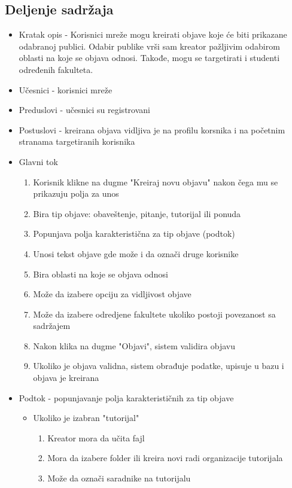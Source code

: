 \subsection{Deljenje sadržaja}
\begin{itemize}
	\item Kratak opis - Korisnici mreže mogu kreirati objave koje će biti prikazane odabranoj publici. Odabir publike vrši sam kreator pažljivim odabirom oblasti na koje se objava odnosi. Takođe, mogu se targetirati i studenti određenih fakulteta.
	\item Učesnici - korisnici mreže
	\item Preduslovi - učesnici su registrovani
	\item Postuslovi - kreirana objava vidljiva je na profilu korsnika i na početnim stranama targetiranih korisnika
	\item Glavni tok
    	\begin{enumerate}
		\item Korisnik klikne na dugme "Kreiraj novu objavu" nakon čega mu se prikazuju polja za unos
		\item Bira tip objave: obaveštenje, pitanje, tutorijal ili ponuda
		\item Popunjava polja karakteristična za tip objave (podtok)
		\item Unosi tekst objave gde može i da označi druge korisnike
	    	\item Bira oblasti na koje se objava odnosi
	    	\item Može da izabere opciju za vidljivost objave
	    	\item Može da izabere odredjene fakultete ukoliko postoji povezanost sa sadržajem
		\item Nakon klika na dugme "Objavi", sistem validira objavu 
	    	\item Ukoliko je objava validna, sistem obrađuje podatke, upisuje u bazu i objava je kreirana
    	\end{enumerate}
	\item Podtok - popunjavanje polja karakterističnih za tip objave
    	\begin{itemize}
        	\item Ukoliko je izabran "tutorijal"
            	\begin{enumerate}
	         	\item Kreator mora da učita fajl
	         	\item Mora da izabere folder ili kreira novi radi organizacije tutorijala
	         	\item Može da označi saradnike na tutorijalu

\end{enumerate}
\end{itemize}
\end{itemize}
